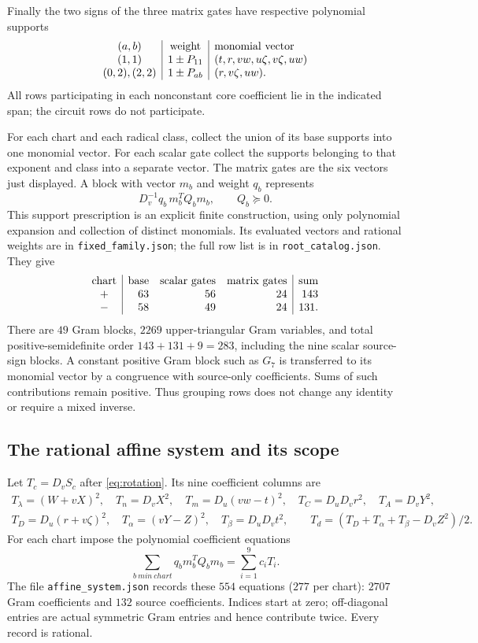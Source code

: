 Finally the two signs of the three matrix gates have respective
polynomial supports
\[
 \begin{array}{c|c|l}
 (a,b)&\hbox{weight}&\hbox{monomial vector}\\
 (1,1)&1\pm P_{11}&(t,r,vw,u\zeta,v\zeta,uw)\\
 (0,2),(2,2)&1\pm P_{ab}&(r,v\zeta,uw).
 \end{array}
\]
All rows participating in each nonconstant core coefficient lie in
the indicated span; the circuit rows do not participate.

For each chart and each radical class, collect the union of its base
supports into one monomial vector. For each scalar gate collect the
supports belonging to that exponent and class into a separate vector.
The matrix gates are the six vectors just displayed. A block with
vector $m_b$ and weight $q_b$ represents
\[
        D_v^{-1}q_b\,m_b^TQ_bm_b,\qquad Q_b\succeq0.
\]
This support prescription is an explicit finite construction, using
only polynomial expansion and collection of distinct monomials.
Its evaluated vectors and rational weights are in
\texttt{fixed\_family.json}; the full row list is in
\texttt{root\_catalog.json}. They give
\[
\begin{array}{c|rrr|r}
 \hbox{chart}&\hbox{base}&\hbox{scalar gates}&\hbox{matrix gates}&\hbox{sum}\\
 +&63&56&24&143\\
 -&58&49&24&131.
\end{array}
\]
There are $49$ Gram blocks, $2269$ upper-triangular Gram variables,
and total positive-semidefinite order $143+131+9=283$, including the
nine scalar source-sign blocks. A constant positive Gram block such
as $G_7$ is transferred to its monomial vector by a congruence with
source-only coefficients. Sums of such contributions remain positive.
Thus grouping rows does not change any identity or require a mixed inverse.

\subsection*{The rational affine system and its scope}
Let $T_c=D_vS_c$ after \eqref{eq:rotation}. Its nine coefficient columns are
\begin{gather*}
 T_\lambda=(W+vX)^2,\quad T_n=D_vX^2,\quad
 T_m=D_u(vw-t)^2,\quad T_C=D_uD_vr^2,\quad T_A=D_vY^2,\\
 T_D=D_u(r+v\zeta)^2,\quad T_\alpha=(vY-Z)^2,\quad
 T_\beta=D_uD_vt^2,\qquad
 T_d=(T_D+T_\alpha+T_\beta-D_vZ^2)/2.
\end{gather*}
For each chart impose the polynomial coefficient equations
\[
       \sum_{b\ {
m in\ chart}}q_bm_b^TQ_bm_b
          =\sum_{i=1}^9 c_iT_i .
\]
The file \texttt{affine\_system.json} records these $554$ equations
($277$ per chart): $2707$ Gram coefficients and $132$ source coefficients.
Indices start at zero; off-diagonal entries are actual symmetric Gram
entries and hence contribute twice. Every record is rational.

